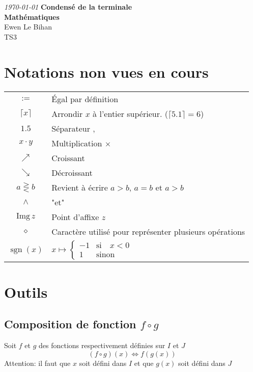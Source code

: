 \documentclass{article}
\newcommand{\img}{\text{Img}\,}
\newcommand{\placeholder}{\diamond}
\begin{document}
\begin{titlepage}
\begin{center}
\textit{\today}
\vfill
\textbf{\LARGE{Condensé de la terminale}\\\Large{Mathématiques}}\\
\vfill
\large{Ewen Le Bihan\\TS3}
\end{center}
\end{titlepage}
\section*{Notations non vues en cours}
\begin{tabular}{c|l}
	$:=$ & Égal par définition\\
	$\lceil x \rceil$ & Arrondir $x$ à l'entier supérieur. ($\lceil 5.1 \rceil = 6$)\\
	$1.5$ & Séparateur ,\\
	$x\cdot y$ & Multiplication $\times$\\
	$\nearrow$ & Croissant\\
	$\searrow$ & Décroissant \\
	$a \gtreqless b$ & Revient à écrire $a > b$, $a = b$ et $a > b$ \\
	$\land$ & "et"\\
	$\img z$ & Point d'affixe $z$\\
	$\placeholder$ & Caractère utilisé pour représenter plusieurs opérations\\
	$\operatorname{sgn}(x)$ & $x \mapsto \begin{cases}
		-1 &\text{si}\quad x < 0 \\
		1 &\text{sinon}
	\end{cases}$ \\
\end{tabular}
\pagestyle{empty}
\newpage
\tableofcontents
\pagestyle{empty}
\newpage

\setcounter{section}{-1}

\section{Outils}
\subsection{Composition de fonction $f \circ g$}
Soit $f$ et $g$ des fonctions respectivement définies sur $I$ et $J$
\[(f \circ g)(x) \iff f(g(x))\]
Attention: il faut que $x$ soit défini dans $I$ et que $g(x)$ soit défini dans $J$\\\\
\end{document}
